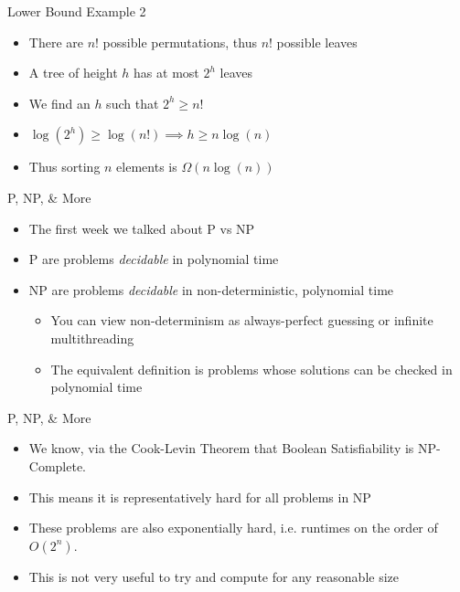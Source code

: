 \documentclass[aspectratio=169]{beamer}
\begin{document}
\begin{frame}{Lower Bound Example 2}
    \begin{itemize}
        \item There are $n!$ possible permutations, thus $n!$ possible leaves \pause
        \item A tree of height $h$ has at most $2^h$ leaves \pause
        \item We find an $h$ such that $2^h \geq n!$ \pause
        \item $\log(2^h) \geq \log(n!) \implies h \geq n \log(n)$ \pause
        \item Thus sorting $n$ elements is $\Omega(n \log(n))$
    \end{itemize}
\end{frame}

\begin{frame}{P, NP, \& More}
    \begin{itemize}
        \item The first week we talked about P vs NP \pause
        \item P are problems \textit{decidable} in polynomial time \pause 
        \item NP are problems \textit{decidable} in non-deterministic, polynomial time \pause
        \begin{itemize}
            \item You can view non-determinism as always-perfect guessing or infinite multithreading \pause
            \item The equivalent definition is problems whose solutions can be checked in polynomial time
        \end{itemize}
    \end{itemize}
\end{frame}

\begin{frame}{P, NP, \& More}
    \begin{itemize}
        \item We know, via the Cook-Levin Theorem that Boolean Satisfiability is NP-Complete. \pause 
        \item This means it is representatively hard for all problems in NP \pause 
        \item These problems are also exponentially hard, i.e. runtimes on the order of $O(2^n)$. \pause
        \item This is not very useful to try and compute for any reasonable size
    \end{itemize}
\end{frame}
\end{document}
